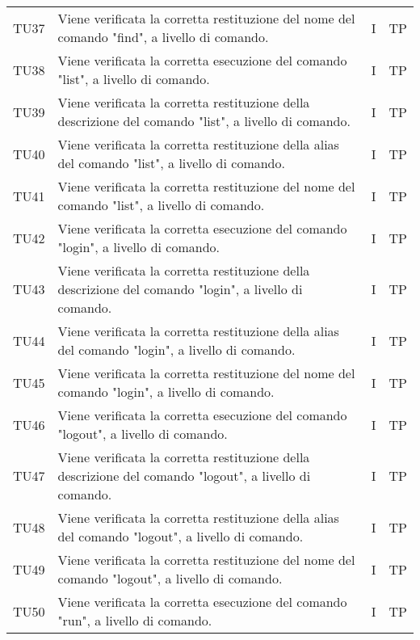 \begin{longtable}{|C{1.5cm}|C{8cm}|C{3cm}|C{1cm}|}
	TU37 &
	Viene verificata la corretta restituzione del nome del comando "find", a livello di comando.  &
	I & TP\\

	TU38 &
	Viene verificata la corretta esecuzione del comando "list", a livello di comando.  &
	I & TP\\

	TU39 &
	Viene verificata la corretta restituzione della descrizione del comando "list", a livello di comando.  &
	I & TP\\

	TU40 &
	Viene verificata la corretta restituzione della alias del comando "list", a livello di comando.  &
	I & TP\\

	TU41 &
	Viene verificata la corretta restituzione del nome del comando "list", a livello di comando.  &
	I & TP\\

	TU42 &
	Viene verificata la corretta esecuzione del comando "login", a livello di comando.  &
	I & TP\\

	TU43 &
	Viene verificata la corretta restituzione della descrizione del comando "login", a livello di comando.  &
	I & TP\\

	TU44 &
	Viene verificata la corretta restituzione della alias del comando "login", a livello di comando.  &
	I & TP\\

	TU45 &
	Viene verificata la corretta restituzione del nome del comando "login", a livello di comando.  &
	I & TP\\

	TU46 &
	Viene verificata la corretta esecuzione del comando "logout", a livello di comando.  &
	I & TP\\

	TU47 &
	Viene verificata la corretta restituzione della descrizione del comando "logout", a livello di comando.  &
	I & TP\\

	TU48 &
	Viene verificata la corretta restituzione della alias del comando "logout", a livello di comando.  &
	I & TP\\

	TU49 &
	Viene verificata la corretta restituzione del nome del comando "logout", a livello di comando.  &
	I & TP \\

	TU50 &
	Viene verificata la corretta esecuzione del comando "run", a livello di comando.  &
	I & TP\\


\end{longtable}
